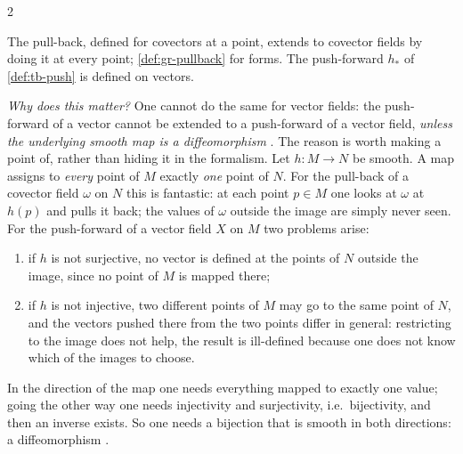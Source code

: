 \begin{paracol}{2}
\begin{recall}
The pull-back, defined for covectors at a point, extends to covector fields by doing it at every point; \cref{def:gr-pullback} for forms. The push-forward $h_*$ of \cref{def:tb-push} is defined on vectors. 
\end{recall}
\emph{Why does this matter?} One cannot do the same for vector fields: the push-forward of a vector cannot be extended to a push-forward of a vector field, \emph{unless the underlying smooth map is a diffeomorphism}   . The reason is worth making a point of, rather than hiding it in the formalism. Let $h\colon M\to N$ be smooth. A map assigns to \emph{every} point of $M$ exactly \emph{one} point of $N$. For the pull-back of a covector field $\omega$ on $N$ this is fantastic: at each point $p\in M$ one looks at $\omega$ at $h(p)$ and pulls it back; the values of $\omega$ outside the image are simply never seen. For the push-forward of a vector field $X$ on $M$ two problems arise:
\begin{enumerate}
  \item if $h$ is not surjective, no vector is defined at the points of $N$ outside the image, since no point of $M$ is mapped there;
  \item if $h$ is not injective, two different points of $M$ may go to the same point of $N$, and the vectors pushed there from the two points differ in general: restricting to the image does not help, the result is ill-defined because one does not know which of the images to choose.
\end{enumerate}
In the direction of the map one needs everything mapped to exactly one value; going the other way one needs injectivity and surjectivity, i.e.\ bijectivity, and then an inverse exists. So one needs a bijection that is smooth in both directions: a diffeomorphism          .


\end{paracol}
